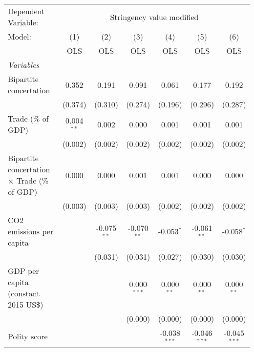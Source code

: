 
\begingroup
\centering
\begin{tabular}{lcccccc}
   \toprule
   Dependent Variable: & \multicolumn{6}{c}{Stringency value modified}\\
   Model:                                              & (1)          & (2)           & (3)           & (4)            & (5)            & (6)\\  
                                                       &  OLS         & OLS           & OLS           & OLS            & OLS            & OLS\\  
   \midrule
   \emph{Variables}\\
   Bipartite concertation                              & 0.352        & 0.191         & 0.091         & 0.061          & 0.177          & 0.192\\   
                                                       & (0.374)      & (0.310)       & (0.274)       & (0.196)        & (0.296)        & (0.287)\\   
   Trade (\% of GDP)                                   & 0.004$^{**}$ & 0.002         & 0.000         & 0.001          & 0.001          & 0.001\\   
                                                       & (0.002)      & (0.002)       & (0.002)       & (0.002)        & (0.002)        & (0.002)\\   
   Bipartite concertation $\times$ Trade (\% of GDP)   & 0.000        & 0.000         & 0.001         & 0.001          & 0.000          & 0.000\\   
                                                       & (0.003)      & (0.003)       & (0.003)       & (0.002)        & (0.002)        & (0.002)\\   
   CO2 emissions per capita                            &              & -0.075$^{**}$ & -0.070$^{**}$ & -0.053$^{*}$   & -0.061$^{**}$  & -0.058$^{*}$\\   
                                                       &              & (0.031)       & (0.031)       & (0.027)        & (0.030)        & (0.030)\\   
   GDP per capita (constant 2015 US\$)                 &              &               & 0.000$^{***}$ & 0.000$^{**}$   & 0.000$^{**}$   & 0.000$^{**}$\\   
                                                       &              &               & (0.000)       & (0.000)        & (0.000)        & (0.000)\\   
   Polity score                                        &              &               &               & -0.038$^{***}$ & -0.046$^{***}$ & -0.045$^{***}$\\   

\end{tabular}

